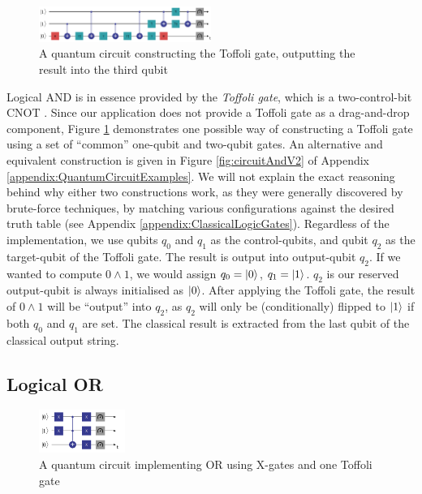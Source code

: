 \documentclass[conference]{IEEEtran}
\begin{document}
\begin{figure}[tbp]
    \centerline{
        \includegraphics[width=0.5\textwidth]{img/circuit_and_v1.png}
    }
    \caption{A quantum circuit constructing the Toffoli gate, outputting the result into the third qubit}
    \label{fig:circuitAndV1}
\end{figure}

Logical AND is in essence provided by the \textit{Toffoli gate}, which is a two-control-bit CNOT \cite{ref:wikipediaquantumlogicgate}.
Since our application does not provide a Toffoli gate as a drag-and-drop component, Figure \ref{fig:circuitAndV1}
demonstrates one possible way of constructing a Toffoli gate using a set of ``common'' one-qubit and two-qubit gates.
An alternative and equivalent construction is given in Figure \ref{fig:circuitAndV2} of Appendix \ref{appendix:QuantumCircuitExamples}.
We will not explain the exact reasoning behind why either two constructions work,
as they were generally discovered by brute-force techniques, by matching various configurations against the desired truth table \cite{ref:quantumvialinearalgebra} (see Appendix \ref{appendix:ClassicalLogicGates}).
Regardless of the implementation, we use qubits $q_0$ and $q_1$ as the control-qubits, and qubit $q_2$ as the target-qubit of the Toffoli gate.
The result is output into output-qubit $q_2$. If we wanted to compute $0 \land 1$, we would assign $q_0 = \ket{0}$, $q_1 = \ket{1}$.
$q_2$ is our reserved output-qubit is always initialised as $\ket{0}$. After applying the Toffoli gate, the result of $0 \land 1$
will be ``output'' into $q_2$, as $q_2$ will only be (conditionally) flipped to $\ket{1}$ if both $q_0$ and $q_1$ are set.
The classical result is extracted from the last qubit of the classical output string.

\subsection{Logical OR}


\begin{figure}[tbp]
    \centerline{
        \includegraphics[width=0.25\textwidth]{img/circuit_or.png}
    }
    \caption{A quantum circuit implementing OR using X-gates and one Toffoli gate}
    \label{fig:circuitOR}
\end{figure}
\end{document}
